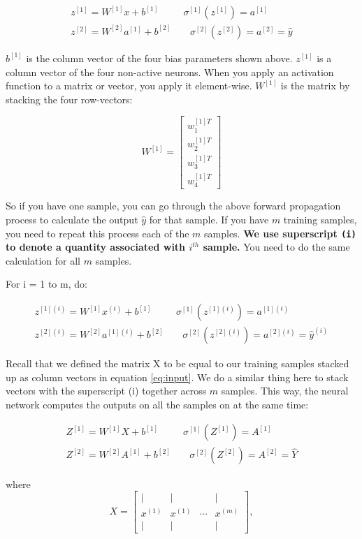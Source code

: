 \documentclass[
  12pt,
]{krantz}
\begin{document}
\[\begin{array}{cc}
z^{[1]}=W^{[1]}x+b^{[1]} & \ \ \sigma^{[1]}(z^{[1]})=a^{[1]}\\
z^{[2]}=W^{[2]}a^{[1]}+b^{[2]} & \ \ \ \ \ \sigma^{[2]}(z^{[2]})=a^{[2]}=\hat{y}
\end{array}\]

\(b^{[1]}\) is the column vector of the four bias parameters shown above. \(z^{[1]}\) is a column vector of the four non-active neurons. When you apply an activation function to a matrix or vector, you apply it element-wise. \(W^{[1]}\) is the matrix by stacking the four row-vectors:

\[W^{[1]}=\left[\begin{array}{c}
w_{1}^{[1]T}\\
w_{2}^{[1]T}\\
w_{3}^{[1]T}\\
w_{4}^{[1]T}
\end{array}\right]\]

So if you have one sample, you can go through the above forward propagation process to calculate the output \(\hat{y}\) for that sample. If you have \(m\) training samples, you need to repeat this process each of the \(m\) samples. \textbf{We use superscript \texttt{(i)} to denote a quantity associated with \(i^{th}\) sample.} You need to do the same calculation for all \(m\) samples.

For i = 1 to m, do:

\[\begin{array}{cc}
z^{[1](i)}=W^{[1]}x^{(i)}+b^{[1]} & \ \ \sigma^{[1]}(z^{[1](i)})=a^{[1](i)}\\
z^{[2](i)}=W^{[2]}a^{[1](i)}+b^{[2]} & \ \ \ \ \ \sigma^{[2]}(z^{[2](i)})=a^{[2](i)}=\hat{y}^{(i)}
\end{array}\]

Recall that we defined the matrix X to be equal to our training samples stacked up as column vectors in equation \eqref{eq:input}. We do a similar thing here to stack vectors with the superscript (i) together across \(m\) samples. This way, the neural network computes the outputs on all the samples on at the same time:

\[\begin{array}{cc}
Z^{[1]}=W^{[1]}X+b^{[1]} & \ \ \sigma^{[1]}(Z^{[1]})=A^{[1]}\\
Z^{[2]}=W^{[2]}A^{[1]}+b^{[2]} & \ \ \ \ \ \sigma^{[2]}(Z^{[2]})=A^{[2]}=\hat{Y}
\end{array}\]

where
\[X=\left[\begin{array}{cccc}
| & | &  & |\\
x^{(1)} & x^{(1)} & \cdots & x^{(m)}\\
| & | &  & |
\end{array}\right],\]
\end{document}
